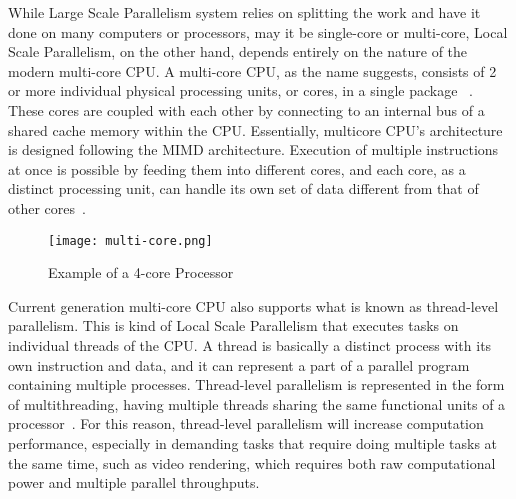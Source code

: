 While Large Scale Parallelism system relies on splitting the work and have it done on many computers or processors, may it be single-core or multi-core, Local Scale Parallelism, on the other hand, depends entirely on the nature of the modern multi-core CPU. A multi-core CPU, as the name suggests, consists of 2 or more individual physical processing units, or cores, in a single package ~\cite{multicore}. These cores are coupled with each other by connecting to an internal bus of a shared cache memory within the CPU. Essentially, multicore CPU's architecture is designed following the MIMD architecture. Execution of multiple instructions at once is possible by feeding them into different cores, and each core, as a distinct processing unit, can handle its own set of data different from that of other cores~\cite{multicore}. \\
\begin{figure}[H]
\texttt{[image: multi-core.png]}
\centering
\caption{Example of a 4-core Processor}
\end{figure}
Current generation multi-core CPU also supports what is known as thread-level parallelism. This is kind of Local Scale Parallelism that executes tasks on individual threads of the CPU. A thread is basically a distinct process with its own instruction and data, and it can represent a part of a parallel program containing multiple processes. Thread-level parallelism is represented in the form of multithreading, having multiple threads sharing the same functional units of a processor~\cite{multicore}. For this reason, thread-level parallelism will increase computation performance, especially in demanding tasks that require doing multiple tasks at the same time, such as video rendering, which requires both raw computational power and multiple parallel throughputs. \\
